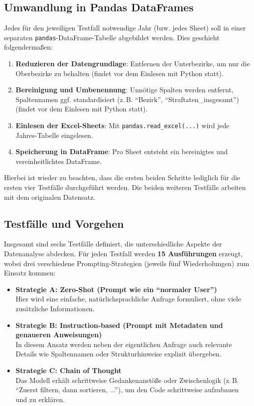 \documentclass[11pt,a4paper]{article}
\begin{document}
\subsection{Umwandlung in Pandas DataFrames}
Jedes für den jeweiligen Testfall notwendige Jahr (bzw. jedes Sheet) soll in einer separaten \texttt{pandas}-DataFrame-Tabelle abgebildet werden. Dies geschieht folgendermaßen:
\begin{enumerate}
    \item \textbf{Reduzieren der Datengrundlage}: Entfernen der Unterbezirke, um nur die Oberbezirke zu behalten (findet vor dem Einlesen mit Python statt).
    \item \textbf{Bereinigung und Umbenennung}: Unnötige Spalten werden entfernt, Spaltennamen ggf. standardisiert (z.\,B. \enquote{Bezirk}, \enquote{Straftaten\_insgesamt})(findet vor dem Einlesen mit Python statt).
    \item \textbf{Einlesen der Excel-Sheets}: Mit \texttt{pandas.read\_excel(...)} wird jede Jahres-Tabelle eingelesen.
    \item \textbf{Speicherung in DataFrame}: Pro Sheet entsteht ein bereinigtes und vereinheitlichtes DataFrame.
\end{enumerate}
Hierbei ist wieder zu beachten, dass die ersten beiden Schritte lediglich für die ersten vier Testfälle durchgeführt werden. Die beiden weiteren Testfälle arbeiten mit dem originalen Datensatz.

\subsection{Testfälle und Vorgehen}
Insgesamt sind sechs Testfälle definiert, die unterschiedliche Aspekte der Datenanalyse abdecken. Für jeden Testfall werden \textbf{15 Ausführungen} erzeugt, wobei drei verschiedene Prompting-Strategien (jeweils fünf Wiederholungen) zum Einsatz kommen:
\begin{itemize}
    \label{itemize:promptingstrategien}
    \item \textbf{Strategie A: Zero-Shot (Prompt wie ein \enquote{normaler User})}\\
    Hier wird eine einfache, natürlichsprachliche Anfrage formuliert, ohne viele zusätzliche Informationen.
    \item \textbf{Strategie B: Instruction-based (Prompt mit Metadaten und genaueren Anweisungen)}\\
    In diesem Ansatz werden neben der eigentlichen Anfrage auch relevante Details wie Spaltennamen oder Strukturhinweise explizit übergeben.
    \item \textbf{Strategie C: Chain of Thought}\\
    Das Modell erhält schrittweise Gedankenanstöße oder Zwischenlogik (z.\,B. \enquote{Zuerst filtern, dann sortieren, ...}), um den Code schrittweise aufzubauen und zu erklären.
\end{itemize}
\end{document}
